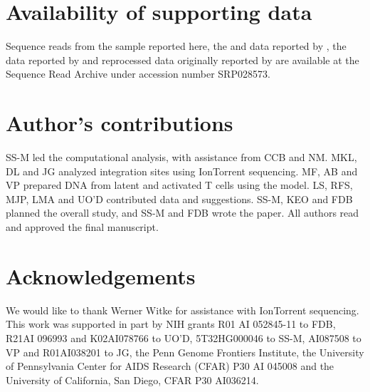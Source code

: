 \documentclass[../sherrill-Mix_thesis.tex]{subfiles}
\begin{document}


\section{Availability of supporting data}
Sequence reads from the \Memory{} sample reported here, the \Resting{} and \Active{} data reported by \citet{Pace2012}, the \Bcl{} data reported by \citet{Shan2011} and  reprocessed data originally reported by \citet{Lewinski2005} are available at the Sequence Read Archive under accession number SRP028573. 

\section{Author's contributions}
	SS-M led the computational analysis, with assistance from CCB and NM.  MKL, DL and JG analyzed integration sites using IonTorrent sequencing.  MF, AB and VP prepared DNA from latent and activated T cells using the \Memory{} model.  LS, RFS, MJP, LMA and UO'D contributed data and suggestions.  SS-M, KEO and FDB planned the overall study, and SS-M and FDB wrote the paper. All authors read and approved the final manuscript. 

\section{Acknowledgements}
  We would like to thank Werner Witke for assistance with IonTorrent sequencing. This work was supported in part by NIH grants R01 AI 052845-11 to FDB, R21AI 096993 and K02AI078766 to UO'D, 5T32HG000046 to SS-M, AI087508 to VP and R01AI038201 to JG, the Penn Genome Frontiers Institute, the University of Pennsylvania Center for AIDS Research (CFAR) P30 AI 045008 and the University of California, San Diego, CFAR P30 AI036214. %
\end{document}
